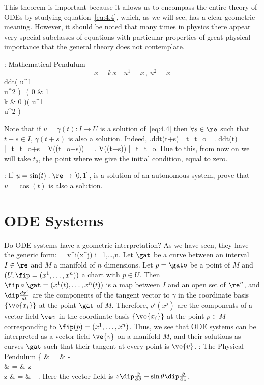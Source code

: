 This theorem is important because it allows us to encompass the entire theory
of ODEs by studying equation~\ref{eq:4.4}, 
which, as we will see, has a clear geometric meaning. 
However, it should be noted that many times in physics
there appear very special subclasses of equations with particular properties
of great physical importance that the general theory does not contemplate.

\ejem: Mathematical Pendulum
$$ \ddot x=k\,x \,\,\,\,\,\,u^1=x\,,\,u^2=\dot x$$
\beq \frac d{dt}\left(
                 u^1 \\ u^2
                 \earr \right)=\left(
                                0 & 1\\
                                k & 0
                                \earr\right)\left(
                                              u^1 \\ u^2
                                              \earr\right)
\eeq 

\espa
Note that if $u = \gamma(t): I \rightarrow U $ is a solution of~\ref{eq:4.4}
then $\forall s\in \re $ such that $t+s \in I$, $\gamma(t+s)$ is also
a solution. Indeed,
\beq
\left.\frac d{dt}\gamma(t+s)\right|_{t=t_o} =\left. \frac d{dt}\gamma(t) 
\right|_{t=t_o+s}= V(\gamma(t_o+s)) = \left. V(\gamma(t+s)) \right|_{t=t_o}.
\eeq
Due to this, from now on we will take $t_o$, the point where we give 
the initial condition, equal to zero.

\ejer:
If $u=\sin(t):\re \rightarrow [0,1]$, is a solution of an autonomous system, 
prove that $u=\cos(t)$ is also a solution.



\section{ODE Systems}

Do ODE systems have a geometric interpretation?
As we have seen, they have the generic form:
\beq
{} = v^i(x^j)\;\;\;\;\;\;\;\;\;\;\; i=1,\ldots,n.
\eeq
Let $\gat$ be a curve between an interval $I\in \re$ and $M$ a manifold of
$n$ dimensions. Let $p=\gato$ be a point of $M$ and
$(U,\fip=(x^1,\ldots,x^n))$ a chart with $p\in U$. Then
$\fip\circ\gat=(x^1(t) ,\ldots,x^n(t))$ is a map between $I$ and an
open set of $\re^n$, and $\dip\frac{dx^i}{dt}$ are the components of the
tangent vector to $\gamma$ in the coordinate basis $\{\ve{x_i}\}$ at the point
$\gat$ of $M$. Therefore, $v^i(x^j)$ are the components of a
vector field $\ve v$ in the coordinate basis $\{\ve{x_i}\}$ at the point
$p\in M$ corresponding to $\fip(p)=(x^1,\ldots,x^n)$. Thus, we see that
ODE systems can be interpreted as a vector field $\ve{v}$ on a manifold $M$, and their solutions as curves $\gat $ 
such that their tangent at every point is $\ve{v}$. 
\espa
\noi
\ejem: The Physical Pendulum
\beq
\left\{
   \ddot\theta  & = & -\sin\theta \;\;\;\;\mbox{} \\
   \dot \theta & = & z  \\
   \dot z & = & -\sin\theta 
   \earr\right.
\eeq
\noi
Here the vector field is $z\dip\frac{\partial}{\partial\theta} -
\sin \theta \dip\frac{\partial}{\partial z}$,

